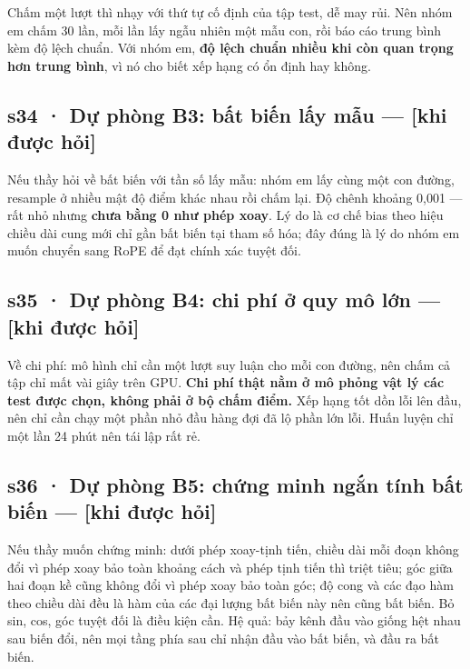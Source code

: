 \documentclass[
  11pt,
]{article}
\begin{document}
Chấm một lượt thì nhạy với thứ tự cố định của tập test, dễ may rủi. Nên
nhóm em chấm 30 lần, mỗi lần lấy ngẫu nhiên một mẫu con, rồi báo cáo
trung bình kèm độ lệch chuẩn. Với nhóm em, \textbf{độ lệch chuẩn nhiều
khi còn quan trọng hơn trung bình}, vì nó cho biết xếp hạng có ổn định
hay không.

\subsection{s34 · Dự phòng B3: bất biến lấy mẫu --- {[}khi được
hỏi{]}}\label{s34-dux1ef1-phuxf2ng-b3-bux1ea5t-biux1ebfn-lux1ea5y-mux1eabu-khi-ux111ux1b0ux1ee3c-hux1ecfi}

Nếu thầy hỏi về bất biến với tần số lấy mẫu: nhóm em lấy cùng một con
đường, resample ở nhiều mật độ điểm khác nhau rồi chấm lại. Độ chênh
khoảng 0,001 --- rất nhỏ nhưng \textbf{chưa bằng 0 như phép xoay}. Lý do
là cơ chế bias theo hiệu chiều dài cung mới chỉ gần bất biến tại tham số
hóa; đây đúng là lý do nhóm em muốn chuyển sang RoPE để đạt chính xác
tuyệt đối.

\subsection{s35 · Dự phòng B4: chi phí ở quy mô lớn --- {[}khi được
hỏi{]}}\label{s35-dux1ef1-phuxf2ng-b4-chi-phuxed-ux1edf-quy-muxf4-lux1edbn-khi-ux111ux1b0ux1ee3c-hux1ecfi}

Về chi phí: mô hình chỉ cần một lượt suy luận cho mỗi con đường, nên
chấm cả tập chỉ mất vài giây trên GPU. \textbf{Chi phí thật nằm ở mô
phỏng vật lý các test được chọn, không phải ở bộ chấm điểm.} Xếp hạng
tốt dồn lỗi lên đầu, nên chỉ cần chạy một phần nhỏ đầu hàng đợi đã lộ
phần lớn lỗi. Huấn luyện chỉ một lần 24 phút nên tái lập rất rẻ.

\subsection{s36 · Dự phòng B5: chứng minh ngắn tính bất biến --- {[}khi
được
hỏi{]}}\label{s36-dux1ef1-phuxf2ng-b5-chux1ee9ng-minh-ngux1eafn-tuxednh-bux1ea5t-biux1ebfn-khi-ux111ux1b0ux1ee3c-hux1ecfi}

Nếu thầy muốn chứng minh: dưới phép xoay-tịnh tiến, chiều dài mỗi đoạn
không đổi vì phép xoay bảo toàn khoảng cách và phép tịnh tiến thì triệt
tiêu; góc giữa hai đoạn kề cũng không đổi vì phép xoay bảo toàn góc; độ
cong và các đạo hàm theo chiều dài đều là hàm của các đại lượng bất biến
này nên cũng bất biến. Bỏ sin, cos, góc tuyệt đối là điều kiện cần. Hệ
quả: bảy kênh đầu vào giống hệt nhau sau biến đổi, nên mọi tầng phía sau
chỉ nhận đầu vào bất biến, và đầu ra bất biến.
\end{document}
